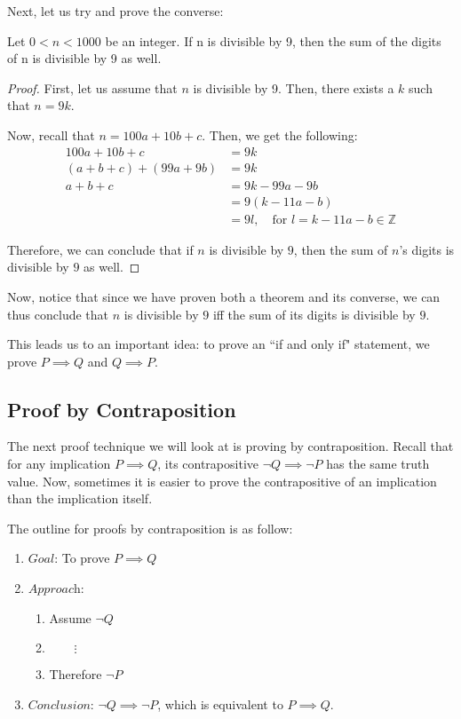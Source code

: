 \documentclass[openany]{book}
\begin{document}
Next, let us try and prove the converse:
\begin{thm}
	Let $0<n<1000$ be an integer. If n is divisible by 9, then the sum of the digits of n is divisible by 9 as well.
\end{thm}
\begin{proof}
	First, let us assume that $n$ is divisible by 9. Then, there exists a $k$ such that $n=9k$.
	
	Now, recall that $n=100a+10b+c$. Then, we get the following:
	\begin{align*}
		100a + 10b + c &= 9k \\
		(a + b + c) + (99a + 9b) &= 9k \\
		a + b + c &= 9k - 99a - 9b \\
		&= 9(k-11a-b) \\
		&= 9l, \quad \text{for }l=k-11a-b\in\mathbb{Z}
	\end{align*}
	
	Therefore, we can conclude that if $n$ is divisible by $9$, then the sum of $n$'s digits is divisible by $9$ as well.
\end{proof}

Now, notice that since we have proven both a theorem and its converse, we can thus conclude that $n$ is divisible by $9$ iff the sum of its digits is divisible by $9$.

This leads us to an important idea: to prove an ``if and only if" statement, we prove $P\implies Q$ and $Q\implies P$.

\subsection{Proof by Contraposition} The next proof technique we will look at is proving by contraposition. Recall that for any implication $P\implies Q$, its contrapositive $\neg Q\implies \neg P$ has the same truth value. Now, sometimes it is easier to prove the contrapositive of an implication than the implication itself.

The outline for proofs by contraposition is as follow:
\begin{enumerate}
	\item[] $\textit{Goal}$: To prove $P\implies Q$
	\item[] $\textit{Approach}$:
	\begin{enumerate}
		\item[] Assume $\neg Q$
		\item[] $\qquad\vdots$
		\item[] Therefore $\neg P$
	\end{enumerate}
	\item[] $\textit{Conclusion}$: $\neg Q \implies \neg P$, which is equivalent to $P \implies Q$.
\end{enumerate}
\end{document}
